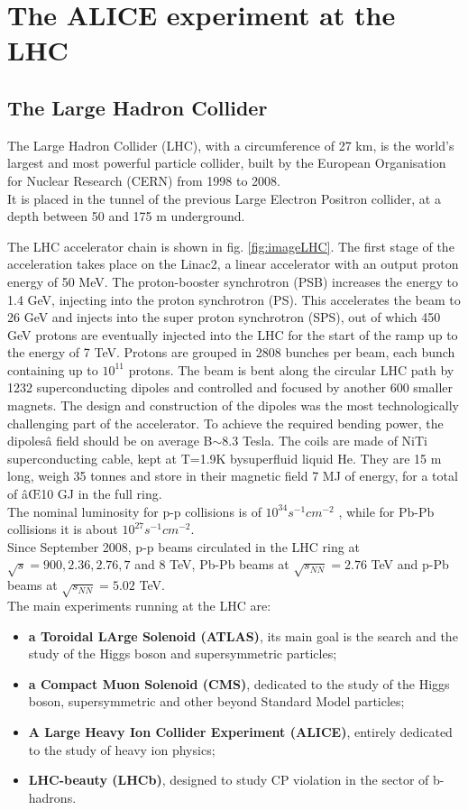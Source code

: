 \chapter{The ALICE experiment at the LHC}

\section{The Large Hadron Collider}
\iffalse
The Large Hadron Collider (LHC), with a circumference of 27 km, 
is the world's largest and most powerful particle collider, built by the 
European Organisation for Nuclear Research (CERN) from 1998 to 2008. \\It is placed in the tunnel of the previous Large Electron Positron collider, at a depth between 50 and 175 m underground.

The LHC accelerator chain is shown in fig. \ref{fig:imageLHC}. The first stage of the acceleration takes place on the Linac2, a linear accelerator with an output proton energy of 50 MeV. The proton-booster synchrotron (PSB) increases the energy to 1.4 GeV, injecting into the proton synchrotron (PS). This accelerates the beam to 26 GeV and injects into the super proton synchrotron (SPS), out of which 450 GeV protons are eventually injected into the LHC for the start of the ramp up to the energy of 7 TeV. Protons are grouped in 2808 bunches per beam, each bunch containing up to $10^{11}$ protons. The beam is bent along the circular LHC path by 1232 superconducting dipoles and controlled and focused by another 600 smaller magnets. The design and construction of the dipoles was the most technologically challenging part of the accelerator. To achieve the required bending power, the dipolesâ field should be on average B$\sim$8.3 Tesla. The coils are made of NiTi superconducting cable, kept at T=1.9K bysuperfluid liquid He. They are 15 m long, weigh 35 tonnes and store in their magnetic field 7 MJ of energy, for a total of âŒ10 GJ in the full ring.\\
The nominal luminosity for p-p collisions is of $10^{34} s^{-1} cm^{-2}$ , while for Pb-Pb collisions it is about $10^{27} s^{-1} cm^{-2}$. \\Since September 2008, p-p beams circulated in the LHC ring at $\sqrt{s}=900, 2.36, 2.76, 7$ and 8 TeV, Pb-Pb beams at $\sqrt{s_{NN}}=2.76$ TeV and p-Pb beams at $\sqrt{s_{NN}}=5.02$ TeV.
\\
The main experiments running at the LHC are:
\begin{itemize}
\item \textbf{a Toroidal LArge Solenoid (ATLAS)}, its main goal is the search and the study of the Higgs boson and supersymmetric particles; 
\item \textbf{a Compact Muon Solenoid (CMS)}, dedicated to the study of the Higgs boson, supersymmetric and other beyond Standard Model particles;
\item \textbf{A Large Heavy Ion Collider Experiment (ALICE)}, entirely dedicated to the study of heavy ion physics;
\item \textbf{LHC-beauty (LHCb)}, designed to study CP violation in the sector of b-hadrons.
\end{itemize}
